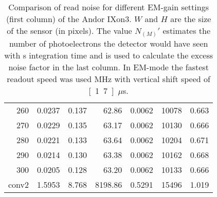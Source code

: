 \begin{table}[!htbp]
\begin{tabular}{r l l r  l r l}
260 & 0.0237 & 0.137 & 62.86 & 0.0062 & 10078 & 0.663 \\
270 & 0.0229 & 0.135 & 63.17 & 0.0062 & 10130 & 0.666 \\
280 & 0.0221 & 0.133 & 63.64 & 0.0062 & 10204 & 0.671 \\
290 & 0.0214 & 0.130 & 63.38 & 0.0062 & 10162 & 0.668 \\
300 & 0.0205 & 0.128 & 63.20 & 0.0062 & 10133 & 0.666 \\
conv2 & 1.5953 & 8.768 & 8198.86 & 0.5291 & 15496 & 1.019 \\
\hline
\end{tabular}
\caption{Comparison of read noise for different EM-gain settings
  (first column) of the Andor IXon3. $W$ and $H$ are the size of the sensor (in pixels). The value $N_{(M)}'$
  estimates the number of photoelectrons the detector would have
  seen with \unit[1]{s} integration time and is used to calculate
  the excess noise factor in the last column. In EM-mode the fastest
  readout speed was used \unit[10]{MHz} with vertical shift speed of
  \unit[1.7]{$\mu$s}.}
  \label{tab:ixon-table}
\end{table}

\newpage

